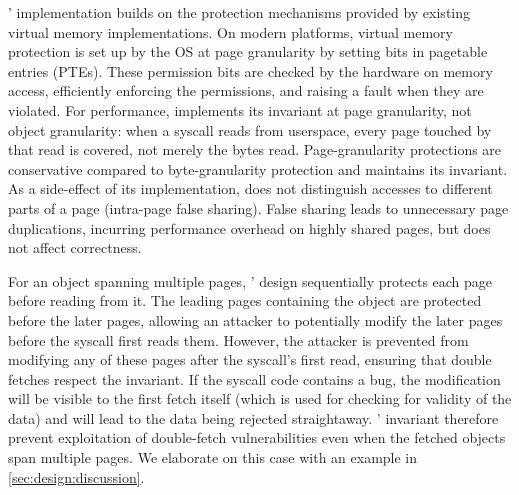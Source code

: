 \documentclass[letterpaper,twocolumn,10pt]{article}
\begin{document}
\midas' implementation builds on the protection mechanisms provided by
existing virtual memory implementations.
On modern platforms, virtual memory protection is set up by the OS at
page granularity by setting bits in pagetable entries (PTEs).
These permission bits are checked by the hardware on memory access,
efficiently enforcing the permissions, and raising a fault when they
are violated.
For performance, \midas implements its invariant at page granularity, not object
granularity: when a syscall reads from userspace, every page touched by that
read is covered, not merely the bytes read.
Page-granularity protections are conservative compared to byte-granularity
protection and \midas maintains its invariant.
As a side-effect of its implementation, \midas does not distinguish
accesses to different parts of a page (intra-page false sharing).
False sharing leads to unnecessary page duplications, incurring performance
overhead on highly shared pages, but does not affect correctness.

For an object spanning multiple pages, \midas' design sequentially
protects each page before reading from it.
The leading pages containing the object are protected before the
later pages, allowing an attacker to potentially modify the later
pages before the syscall first reads them.
However, the attacker is prevented from modifying any of these pages
after the syscall's first read, ensuring that double fetches respect
the invariant.
If the syscall code contains a \tocttou bug, the modification will
be visible to the first fetch itself (which is used for checking for
validity of the data) and will lead to the data being rejected
straightaway.
\midas' invariant therefore prevent exploitation of double-fetch
vulnerabilities even when the fetched objects span multiple pages.
We elaborate on this case with an example in \autoref{sec:design:discussion}.
\end{document}
